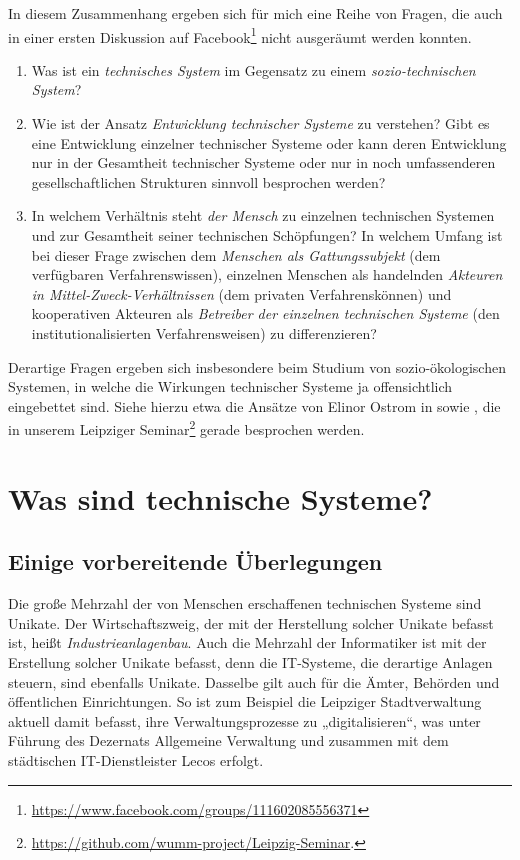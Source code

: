 \documentclass[11pt,a4paper]{article}
\begin{document}
In diesem Zusammenhang ergeben sich für mich eine Reihe von Fragen, die auch
in einer ersten Diskussion auf
Facebook\footnote{\url{https://www.facebook.com/groups/111602085556371}} nicht
ausgeräumt werden konnten.
\begin{enumerate}
\item Was ist ein \emph{technisches System} im Gegensatz zu einem
  \emph{sozio-technischen System}?
\item Wie ist der Ansatz \emph{Entwicklung technischer Systeme} zu verstehen?
  Gibt es eine Entwicklung einzelner technischer Systeme oder kann deren
  Entwicklung nur in der Gesamtheit technischer Systeme oder nur in noch
  umfassenderen gesellschaftlichen Strukturen sinnvoll besprochen werden?
\item In welchem Verhältnis steht \emph{der Mensch} zu einzelnen technischen
  Systemen und zur Gesamtheit seiner technischen Schöpfungen? In welchem
  Umfang ist bei dieser Frage zwischen dem \emph{Menschen als Gattungssubjekt}
  (dem verfügbaren Verfahrenswissen), einzelnen Menschen als handelnden
  \emph{Akteuren in Mittel-Zweck-Verhältnissen} (dem privaten
  Verfahrenskönnen) und kooperativen Akteuren als \emph{Betreiber der
    einzelnen technischen Systeme} (den institutionalisierten
  Verfahrensweisen) zu differenzieren?
\end{enumerate}

Derartige Fragen ergeben sich insbesondere beim Studium von sozio-ökologischen
Systemen, in welche die Wirkungen technischer Systeme ja offensichtlich
eingebettet sind.  Siehe hierzu etwa die Ansätze von Elinor Ostrom in
\cite{Anderies2004} sowie \cite{Ostrom2007}, die in unserem Leipziger
Seminar\footnote{\url{https://github.com/wumm-project/Leipzig-Seminar}.}
gerade besprochen werden.

\section{Was sind technische Systeme?}

\subsection{Einige vorbereitende Überlegungen}

Die große Mehrzahl der von Menschen erschaffenen technischen Systeme sind
Unikate. Der Wirtschaftszweig, der mit der Herstellung solcher Unikate befasst
ist, heißt \emph{Industrieanlagenbau}. Auch die Mehrzahl der Informatiker ist
mit der Erstellung solcher Unikate befasst, denn die IT-Systeme, die derartige
Anlagen steuern, sind ebenfalls Unikate.  Dasselbe gilt auch für die Ämter,
Behörden und öffentlichen Einrichtungen. So ist zum Beispiel die Leipziger
Stadtverwaltung aktuell damit befasst, ihre Verwaltungsprozesse zu
„digitalisieren“, was unter Führung des Dezernats Allgemeine Verwaltung und
zusammen mit dem städtischen IT-Dienstleister Lecos erfolgt.
\end{document}
